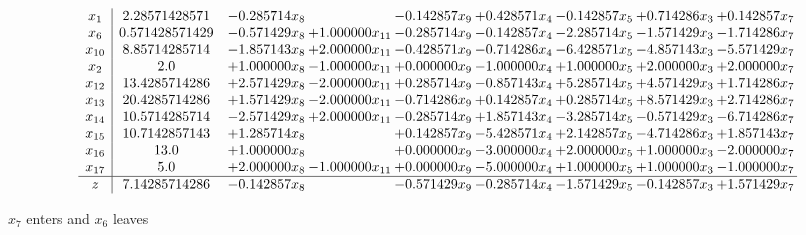 \documentclass[10pt]{article}
\begin{document}
 \[\begin{array}{c| c c@{\hskip 2pt} c@{\hskip 2pt} c@{\hskip 2pt} c@{\hskip 2pt} c@{\hskip 2pt} c@{\hskip 2pt} c@{\hskip 2pt} }
 x_{1}   &  2.28571428571 & -0.285714 x_{8} &   & -0.142857 x_{9} & + 0.428571 x_{4} & -0.142857 x_{5} & + 0.714286 x_{3} & + 0.142857 x_{7}\\
 x_{6}   &  0.571428571429 & -0.571429 x_{8} & + 1.000000 x_{11} & -0.285714 x_{9} & -0.142857 x_{4} & -2.285714 x_{5} & -1.571429 x_{3} & -1.714286 x_{7}\\
 x_{10}   &  8.85714285714 & -1.857143 x_{8} & + 2.000000 x_{11} & -0.428571 x_{9} & -0.714286 x_{4} & -6.428571 x_{5} & -4.857143 x_{3} & -5.571429 x_{7}\\
 x_{2}   &  2.0 & + 1.000000 x_{8} & -1.000000 x_{11} & + 0.000000 x_{9} & -1.000000 x_{4} & + 1.000000 x_{5} & + 2.000000 x_{3} & + 2.000000 x_{7}\\
 x_{12}   &  13.4285714286 & + 2.571429 x_{8} & -2.000000 x_{11} & + 0.285714 x_{9} & -0.857143 x_{4} & + 5.285714 x_{5} & + 4.571429 x_{3} & + 1.714286 x_{7}\\
 x_{13}   &  20.4285714286 & + 1.571429 x_{8} & -2.000000 x_{11} & -0.714286 x_{9} & + 0.142857 x_{4} & + 0.285714 x_{5} & + 8.571429 x_{3} & + 2.714286 x_{7}\\
 x_{14}   &  10.5714285714 & -2.571429 x_{8} & + 2.000000 x_{11} & -0.285714 x_{9} & + 1.857143 x_{4} & -3.285714 x_{5} & -0.571429 x_{3} & -6.714286 x_{7}\\
 x_{15}   &  10.7142857143 & + 1.285714 x_{8} &   & + 0.142857 x_{9} & -5.428571 x_{4} & + 2.142857 x_{5} & -4.714286 x_{3} & + 1.857143 x_{7}\\
 x_{16}   &  13.0 & + 1.000000 x_{8} &   & + 0.000000 x_{9} & -3.000000 x_{4} & + 2.000000 x_{5} & + 1.000000 x_{3} & -2.000000 x_{7}\\
 x_{17}   &  5.0 & + 2.000000 x_{8} & -1.000000 x_{11} & + 0.000000 x_{9} & -5.000000 x_{4} & + 1.000000 x_{5} & + 1.000000 x_{3} & -1.000000 x_{7}\\
\hline
z    &  7.14285714286 & -0.142857 x_{8} &   & -0.571429 x_{9} & -0.285714 x_{4} & -1.571429 x_{5} & -0.142857 x_{3} & + 1.571429 x_{7}\\
\end{array}\]


 $ x_{7} $ enters and $ x_{6} $ leaves 
\end{document}
